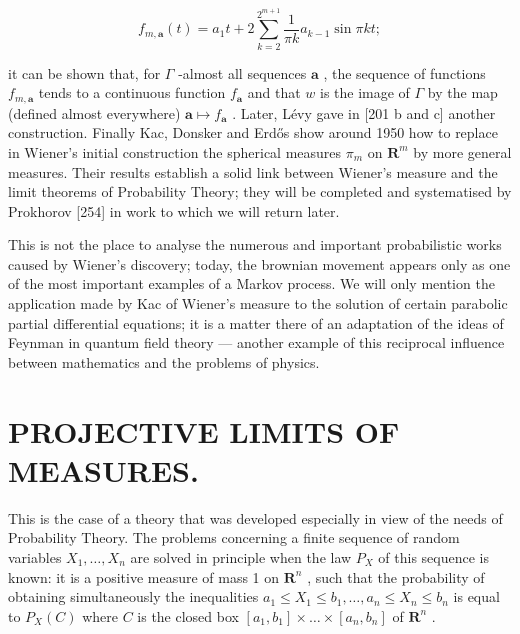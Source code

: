 \[
f _ {m, \mathbf {a}} (t) = a _ {1} t + 2 \sum_ {k = 2} ^ {2 ^ {m + 1}} \frac {1}{\pi k} a _ {k - 1} \sin \pi k t;
\]

it can be shown that, for \(\Gamma\) -almost all sequences \(\mathbf{a}\) , the sequence of functions \(f_{m,\mathbf{a}}\) tends to a continuous function \(f_{\mathbf{a}}\) and that \(w\) is the image of \(\Gamma\) by the map (defined almost everywhere) \(\mathbf{a} \mapsto f_{\mathbf{a}}\) . Later, Lévy gave in {[}201 b and c{]} another construction. Finally Kac, Donsker and Erdős show around 1950 how to replace in Wiener's initial construction the spherical measures \(\pi_m\) on \(\mathbf{R}^m\) by more general measures. Their results establish a solid link between Wiener's measure and the limit theorems of Probability Theory; they will be completed and systematised by Prokhorov {[}254{]} in work to which we will return later.

This is not the place to analyse the numerous and important probabilistic works caused by Wiener's discovery; today, the brownian movement appears only as one of the most important examples of a Markov process. We will only mention the application made by Kac of Wiener's measure to the solution of certain parabolic partial differential equations; it is a matter there of an adaptation of the ideas of Feynman in quantum field theory --- another example of this reciprocal influence between mathematics and the problems of physics.

\section*{PROJECTIVE LIMITS OF MEASURES.}
{}

This is the case of a theory that was developed especially in view of the needs of Probability Theory. The problems concerning a finite sequence of random variables \(X_{1}, \ldots, X_{n}\) are solved in principle when the law \(P_{X}\) of this sequence is known: it is a positive measure of mass 1 on \(\mathbf{R}^{n}\) , such that the probability of obtaining simultaneously the inequalities \(a_{1} \leq X_{1} \leq b_{1}, \ldots, a_{n} \leq X_{n} \leq b_{n}\) is equal to \(P_{X}(C)\) where \(C\) is the closed box \([a_{1}, b_{1}] \times \ldots \times [a_{n}, b_{n}]\) of \(\mathbf{R}^{n}\) .

